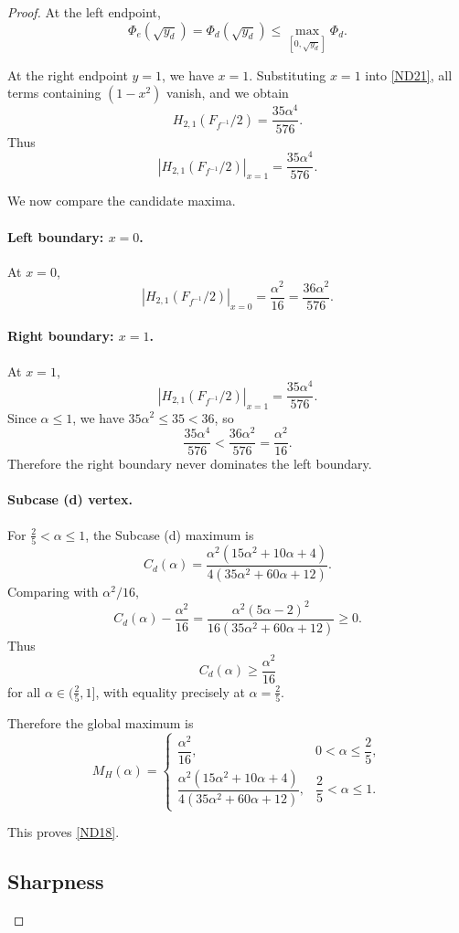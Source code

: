 \documentclass[11pt,reqno]{amsart}
\numberwithin{equation}{section}
\begin{document}
\begin{proof}
At the left endpoint,
\[
\Phi_e(\sqrt{y_d})=\Phi_d(\sqrt{y_d})
\le
\max_{[0,\sqrt{y_d}]}\Phi_d.
\]

At the right endpoint $y=1$, we have $x=1$. Substituting $x=1$ into \eqref{ND21}, all terms containing $(1-x^2)$ vanish, and we obtain
\[
H_{2,1}\!\left(F_{f^{-1}}/2\right)
=
\frac{35\alpha^4}{576}.
\]
Thus
\begin{equation}\label{boundary_hankel_correct}
|H_{2,1}(F_{f^{-1}}/2)|_{x=1}
=
\frac{35\alpha^4}{576}.
\end{equation}

We now compare the candidate maxima.

\paragraph{Left boundary: $x=0$.}
At $x=0$,
\[
|H_{2,1}(F_{f^{-1}}/2)|_{x=0}
=
\frac{\alpha^2}{16}
=
\frac{36\alpha^2}{576}.
\]

\paragraph{Right boundary: $x=1$.}
At $x=1$,
\[
|H_{2,1}(F_{f^{-1}}/2)|_{x=1}
=
\frac{35\alpha^4}{576}.
\]
Since $\alpha\le 1$, we have $35\alpha^2\le 35<36$, so
\[
\frac{35\alpha^4}{576}
<
\frac{36\alpha^2}{576}
=
\frac{\alpha^2}{16}.
\]
Therefore the right boundary never dominates the left boundary.

\paragraph{Subcase (d) vertex.}
For $\frac25<\alpha\le 1$, the Subcase (d) maximum is
\[
C_d(\alpha)
=
\frac{\alpha^2(15\alpha^2+10\alpha+4)}{4(35\alpha^2+60\alpha+12)}.
\]
Comparing with $\alpha^2/16$,
\[
C_d(\alpha)-\frac{\alpha^2}{16}
=
\frac{\alpha^2(5\alpha-2)^2}
{16(35\alpha^2+60\alpha+12)}
\ge0.
\]
Thus
\[
C_d(\alpha)\ge \frac{\alpha^2}{16}
\]
for all $\alpha\in(\frac25,1]$, with equality precisely at $\alpha=\frac25$.

Therefore the global maximum is
\[
M_H(\alpha)
=
\begin{cases}
\dfrac{\alpha^2}{16}, & 0<\alpha\le \dfrac25,\\[8pt]
\dfrac{\alpha^2(15\alpha^2+10\alpha+4)}{4(35\alpha^2+60\alpha+12)}, & \dfrac25<\alpha\le 1.
\end{cases}
\]

This proves \eqref{ND18}.

\subsection*{Sharpness}


\end{proof}
\end{document}
